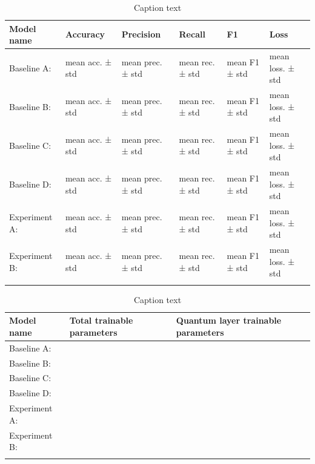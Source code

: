 \begin{table}[h]
\caption{Caption text}\label{tab1}%
\begin{tabular}{@{}llllll@{}}
\toprule
Model name  & Accuracy & Precision & Recall & F1 & Loss \\
\midrule
Baseline A: & mean acc. ± std & mean prec. ± std & mean rec. ± std & mean F1 ± std & mean loss. ± std\\
Baseline B: & mean acc. ± std & mean prec. ± std & mean rec. ± std & mean F1 ± std & mean loss. ± std\\
Baseline C: & mean acc. ± std & mean prec. ± std & mean rec. ± std & mean F1 ± std & mean loss. ± std\\
Baseline D: & mean acc. ± std & mean prec. ± std & mean rec. ± std & mean F1 ± std & mean loss. ± std\\
Experiment A: & mean acc. ± std & mean prec. ± std & mean rec. ± std & mean F1 ± std & mean loss. ± std\\
Experiment B: & mean acc. ± std & mean prec. ± std & mean rec. ± std & mean F1 ± std & mean loss. ± std\\
\botrule
\end{tabular}
\end{table}

\begin{table}[h]
\caption{Caption text}\label{tab2}%
\begin{tabular}{@{}lll@{}}
\toprule
Model name  & Total trainable parameters & Quantum layer trainable parameters \\
\midrule
Baseline A: & & \\
Baseline B: & & \\
Baseline C: & & \\
Baseline D: & & \\
Experiment A: & & \\
Experiment B: & & \\
\botrule
\end{tabular}
\end{table}